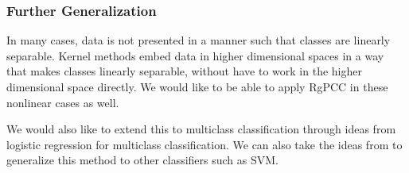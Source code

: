 \documentclass[main.tex]{subfiles}
\begin{document}
\subsubsection{Further Generalization}
In many cases, data is not presented in a manner such that classes are linearly separable. Kernel methods embed data in higher dimensional spaces in a way that makes classes linearly separable, without have to work in the higher dimensional space directly. We would like to be able to apply RgPCC in these nonlinear cases as well.

We would also like to extend this to multiclass classification through ideas from logistic regression for multiclass classification. We can also take the ideas from \cite{wangleng} to generalize this method to other classifiers such as SVM.
\end{document}
